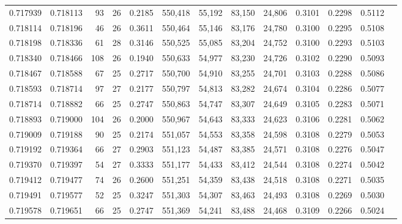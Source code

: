 \begin{tabular}{rrrrrrrrrrrrr}
0.717939 & 0.718113 &    93 &  26 &                                     0.2185 & 550,418 &  55,192 &  83,150 &  24,806 & 0.3101 & 0.2298 & 0.5112 \\
0.718114 & 0.718196 &    46 &  26 &                                     0.3611 & 550,464 &  55,146 &  83,176 &  24,780 & 0.3100 & 0.2295 & 0.5108 \\
0.718198 & 0.718336 &    61 &  28 &                                     0.3146 & 550,525 &  55,085 &  83,204 &  24,752 & 0.3100 & 0.2293 & 0.5103 \\
0.718340 & 0.718466 &   108 &  26 &                                     0.1940 & 550,633 &  54,977 &  83,230 &  24,726 & 0.3102 & 0.2290 & 0.5093 \\
0.718467 & 0.718588 &    67 &  25 &                                     0.2717 & 550,700 &  54,910 &  83,255 &  24,701 & 0.3103 & 0.2288 & 0.5086 \\
0.718593 & 0.718714 &    97 &  27 &                                     0.2177 & 550,797 &  54,813 &  83,282 &  24,674 & 0.3104 & 0.2286 & 0.5077 \\
0.718714 & 0.718882 &    66 &  25 &                                     0.2747 & 550,863 &  54,747 &  83,307 &  24,649 & 0.3105 & 0.2283 & 0.5071 \\
0.718893 & 0.719000 &   104 &  26 &                                     0.2000 & 550,967 &  54,643 &  83,333 &  24,623 & 0.3106 & 0.2281 & 0.5062 \\
0.719009 & 0.719188 &    90 &  25 &                                     0.2174 & 551,057 &  54,553 &  83,358 &  24,598 & 0.3108 & 0.2279 & 0.5053 \\
0.719192 & 0.719364 &    66 &  27 &                                     0.2903 & 551,123 &  54,487 &  83,385 &  24,571 & 0.3108 & 0.2276 & 0.5047 \\
0.719370 & 0.719397 &    54 &  27 &                                     0.3333 & 551,177 &  54,433 &  83,412 &  24,544 & 0.3108 & 0.2274 & 0.5042 \\
0.719412 & 0.719477 &    74 &  26 &                                     0.2600 & 551,251 &  54,359 &  83,438 &  24,518 & 0.3108 & 0.2271 & 0.5035 \\
0.719491 & 0.719577 &    52 &  25 &                                     0.3247 & 551,303 &  54,307 &  83,463 &  24,493 & 0.3108 & 0.2269 & 0.5030 \\
0.719578 & 0.719651 &    66 &  25 &                                     0.2747 & 551,369 &  54,241 &  83,488 &  24,468 & 0.3109 & 0.2266 & 0.5024 \\

\end{tabular}

